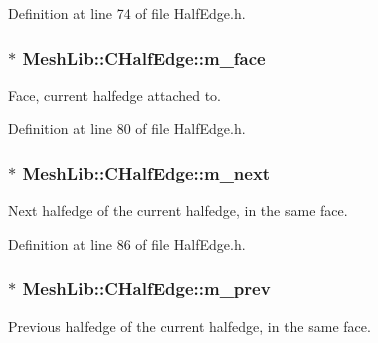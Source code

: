 Definition at line 74 of file Half\+Edge.\+h.

\subsubsection[{\texorpdfstring{m\+\_\+face}{m_face}}]{$\ast$ Mesh\+Lib\+::\+C\+Half\+Edge\+::m\+\_\+face\hspace{0.3cm}{\ttfamily [protected]}}\hypertarget{class_mesh_lib_1_1_c_half_edge_a46309154e53acc173e688a8fe1299ef9}{}\label{class_mesh_lib_1_1_c_half_edge_a46309154e53acc173e688a8fe1299ef9}
Face, current halfedge attached to. 

Definition at line 80 of file Half\+Edge.\+h.

\subsubsection[{\texorpdfstring{m\+\_\+next}{m_next}}]{$\ast$ Mesh\+Lib\+::\+C\+Half\+Edge\+::m\+\_\+next\hspace{0.3cm}{\ttfamily [protected]}}\hypertarget{class_mesh_lib_1_1_c_half_edge_ac9688abf74f8ab58b051fd2eb3895704}{}\label{class_mesh_lib_1_1_c_half_edge_ac9688abf74f8ab58b051fd2eb3895704}
Next halfedge of the current halfedge, in the same face. 

Definition at line 86 of file Half\+Edge.\+h.

\subsubsection[{\texorpdfstring{m\+\_\+prev}{m_prev}}]{$\ast$ Mesh\+Lib\+::\+C\+Half\+Edge\+::m\+\_\+prev\hspace{0.3cm}{\ttfamily [protected]}}\hypertarget{class_mesh_lib_1_1_c_half_edge_a7aaae52cda7d9cf2a18c42351c27b71e}{}\label{class_mesh_lib_1_1_c_half_edge_a7aaae52cda7d9cf2a18c42351c27b71e}
Previous halfedge of the current halfedge, in the same face. 

